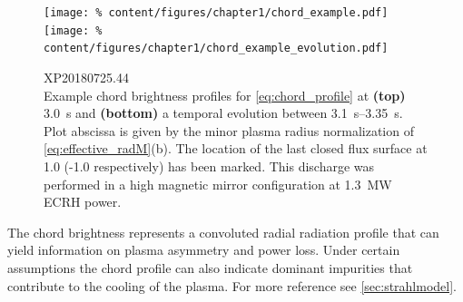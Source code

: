 %
                \begin{figure}%
                    \centering%
                    \texttt{[image: \%
                        content/figures/chapter1/chord\_example.pdf]}\\%
                    \texttt{[image: \%
                        content/figures/chapter1/chord\_example\_evolution.pdf]}%
                    \caption{%
                        XP20180725.44\\%
                        Example chord brightness profiles for \cref{eq:chord_profile} at \textbf{(top)} \SI{3.0}{\second} and \textbf{(bottom)} a temporal evolution between \SIrange{3.1}{3.35}{\second}. Plot abscissa is given by the minor plasma radius normalization of \cref{eq:effective_radM}(b). The location of the last closed flux surface at 1.0 (-1.0 respectively) has been marked. This discharge was performed in a high magnetic mirror configuration at \SI{1.3}{\mega\watt} ECRH power.}\label{fig:chord_examples}%
                \end{figure}%
%
                The chord brightness represents a convoluted radial radiation profile that can yield information on plasma asymmetry and power loss. Under certain assumptions the chord profile can also indicate dominant impurities that contribute to the cooling of the plasma. For more reference see \cref{sec:strahlmodel}.
%
